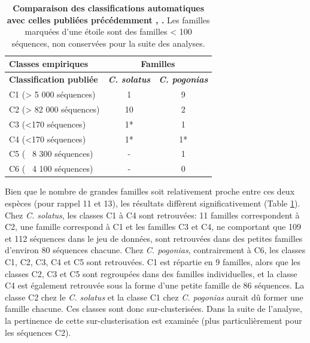 \documentclass[12pt,a4paper]{article}
\begin{document}
		\begin{table}
		\caption{\textbf{Comparaison des classifications automatiques avec celles publiées précédemment \cite{Cacheux2016}, \cite{Cacheux2018}.} Les familles marquées d'une étoile sont des familles < 100 séquences, non conservées pour la suite des analyses.}
			\center
			\begin{tabular}{|l|c|c|}
			\hline
			\textbf{Classes empiriques} & \multicolumn{2}{c|}{\textbf{Familles}} \\
	    	\hline
			\textbf{Classification publiée} &  \textbf{\textit{C. solatus}}  & \textbf{\textit{C. pogonias}}\\
			\hline
			C1 (> 5 000 séquences) &  1  & 9\\
			\hline
			C2 (> 82 000 séquences) & 10  & 2 \\
			\hline
			C3 (<170 séquences) & 1* & 1 \\
			\hline
			C4 (<170 séquences) & 1* & 1* \\
			\hline
			C5 (~ 8 300 séquences)& - 	 &  1 \\
			\hline
			C6 (~ 4 100 séquences) & -   &  0 \\
			\hline
			\end{tabular}
		\label{tab_count_fam}
	\end{table}
		
	Bien que le nombre de grandes familles soit relativement proche entre ces deux espèces (pour rappel 11 et 13), les résultats diffèrent significativement (Table \ref{tab_count_fam}). Chez \textit{C. solatus}, les classes C1 à C4 sont retrouvées: 11 familles correspondent à C2, une famille correspond à C1 et les familles C3 et C4, ne comportant que 109 et 112 séquences dans le jeu de données, sont retrouvées dans des petites familles d'environ 80 séquences chacune. Chez \textit{C. pogonias}, contrairement à C6, les classes C1, C2, C3, C4 et C5 sont retrouvées. C1 est répartie en 9 familles, alors que les classes C2, C3 et C5 sont regroupées dans des familles individuelles, et la classe C4 est également retrouvée sous la forme d'une petite famille de 86 séquences. La classe C2 chez le \textit{C. solatus} et la classe C1 chez \textit{C. pogonias} aurait dû former une famille chacune. Ces classes sont donc sur-clusterisées. Dans la suite de l'analyse, la pertinence de cette sur-clusterisation est examinée (plus particulièrement pour les séquences C2).
	
\end{document}
